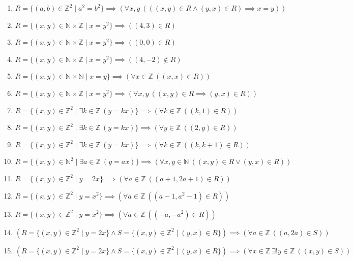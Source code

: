 \documentclass[11pt,a4paper]{article}
\begin{document}
\begin{enumerate}
\item $\displaystyle R = \{(a, b) \in \mathbb{Z}^{2} \mid a^{2} = b^{2}\} \implies (\forall x, y\ (((x, y) \in R \land (y, x) \in R) \implies x = y))$
\item $\displaystyle R = \{(x, y) \in \mathbb{N} \times \mathbb{Z} \mid x = y^{2}\} \implies ((4, 3) \in R)$
\item $\displaystyle R = \{(x, y) \in \mathbb{N} \times \mathbb{Z} \mid x = y^{2}\} \implies ((0, 0) \in R)$
\item $\displaystyle R = \{(x, y) \in \mathbb{N} \times \mathbb{Z} \mid x = y^{2}\} \implies ((4, -2) \notin R)$
\item $\displaystyle R = \{(x, y) \in \mathbb{N} \times \mathbb{N} \mid x = y\} \implies (\forall x \in \mathbb{Z}\ ((x, x) \in R))$
\item $\displaystyle R = \{(x, y) \in \mathbb{N} \times \mathbb{Z} \mid x = y^{2}\} \implies (\forall x, y\ ((x, y) \in R \implies (y, x) \in R))$
\item $\displaystyle R = \{(x, y) \in \mathbb{Z}^{2} \mid \exists k \in \mathbb{Z}\ (y = kx)\} \implies (\forall k \in \mathbb{Z}\ ((k, 1) \in R))$
\item $\displaystyle R = \{(x, y) \in \mathbb{Z}^{2} \mid \exists k \in \mathbb{Z}\ (y = kx)\} \implies (\forall y \in \mathbb{Z}\ ((2, y) \in R))$
\item $\displaystyle R = \{(x, y) \in \mathbb{Z}^{2} \mid \exists k \in \mathbb{Z}\ (y = kx)\} \implies (\forall k \in \mathbb{Z}\ ((k, k + 1) \in R))$
\item $\displaystyle R = \{(x, y) \in \mathbb{N}^{2} \mid \exists a \in \mathbb{Z}\ (y = ax)\} \implies (\forall x, y \in \mathbb{N}\ ((x, y) \in R \lor (y, x) \in R))$
\item $\displaystyle R = \{(x, y) \in \mathbb{Z}^{2} \mid y = 2x\} \implies (\forall a \in \mathbb{Z}\ ((a + 1, 2a + 1) \in R))$
\item $\displaystyle R = \{(x, y) \in \mathbb{Z}^{2} \mid y = x^{2}\} \implies (\forall a \in \mathbb{Z}\ ((a - 1, a^{2} - 1) \in R))$
\item $\displaystyle R = \{(x, y) \in \mathbb{Z}^{2} \mid y = x^{2}\} \implies (\forall a \in \mathbb{Z}\ ((-a, -a^{2}) \in R))$
\item $\displaystyle (R = \{(x, y) \in \mathbb{Z}^{2} \mid y = 2x\} \land S = \{(x, y) \in \mathbb{Z}^{2} \mid (y, x) \in R\}) \implies (\forall a \in \mathbb{Z}\ ((a, 2a) \in S))$
\item $\displaystyle (R = \{(x, y) \in \mathbb{Z}^{2} \mid y = 2x\} \land S = \{(x, y) \in \mathbb{Z}^{2} \mid (y, x) \in R\}) \implies (\forall x \in \mathbb{Z}\ \exists! y \in \mathbb{Z}\ ((x, y) \in S))$

\end{enumerate}
\end{document}
